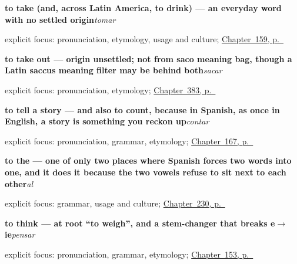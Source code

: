 \noindent\begin{minipage}[t]{\linewidth}
\raggedright
\textbf{to take (and, across Latin America, to drink) — an everyday word with no settled origin}\enspace\emph{tomar}\par
\footnotesize explicit focus: pronunciation, etymology, usage and culture; \hyperref[ch:spanish-tomar]{Chapter~159, p.~\pageref*{ch:spanish-tomar}}
\end{minipage}\par\smallskip

\noindent\begin{minipage}[t]{\linewidth}
\raggedright
\textbf{to take out — origin unsettled; not from saco meaning bag, though a Latin saccus meaning filter may be behind both}\enspace\emph{sacar}\par
\footnotesize explicit focus: pronunciation, etymology; \hyperref[ch:guardar-y-dejar]{Chapter~383, p.~\pageref*{ch:guardar-y-dejar}}
\end{minipage}\par\smallskip

\noindent\begin{minipage}[t]{\linewidth}
\raggedright
\textbf{to tell a story — and also to count, because in Spanish, as once in English, a story is something you reckon up}\enspace\emph{contar}\par
\footnotesize explicit focus: pronunciation, grammar, etymology; \hyperref[ch:spanish-narrating]{Chapter~167, p.~\pageref*{ch:spanish-narrating}}
\end{minipage}\par\smallskip

\noindent\begin{minipage}[t]{\linewidth}
\raggedright
\textbf{to the — one of only two places where Spanish forces two words into one, and it does it because the two vowels refuse to sit next to each other}\enspace\emph{al}\par
\footnotesize explicit focus: grammar, usage and culture; \hyperref[ch:al]{Chapter~230, p.~\pageref*{ch:al}}
\end{minipage}\par\smallskip

\noindent\begin{minipage}[t]{\linewidth}
\raggedright
\textbf{to think — at root \textquotedblleft{}to weigh\textquotedblright{}, and a stem-changer that breaks e$\to$ie}\enspace\emph{pensar}\par
\footnotesize explicit focus: pronunciation, grammar, etymology; \hyperref[ch:spanish-pensar]{Chapter~153, p.~\pageref*{ch:spanish-pensar}}
\end{minipage}\par\smallskip

